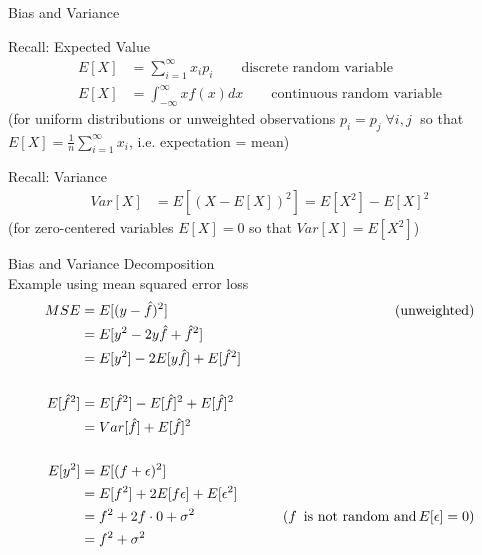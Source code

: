 \documentclass[ignorenonframetext,xcolor=x11names]{beamer}
\begin{document}
\begin{frame}{Bias and Variance}
\begin{block}{Recall: Expected Value}
\begin{align*}
E[X] &= \sum_{i=1}^{\infty} x_i p_i \qquad \text{discrete random variable}\\
E[X] &= \int_{-\infty}^{\infty} x f(x) dx \qquad \text{continuous random variable}
\end{align*}
(for uniform distributions or unweighted observations $p_i=p_j \; \forall i, j \; $ so that $E[X] = \frac{1}{n} \sum_{i=1}^{\infty} x_i $, i.e. expectation = mean)
\end{block}

\begin{block}{Recall: Variance}
\begin{align*}
Var[X] &= E[(X - E[X])^2] = E[X^2] - E[X]^2 
\end{align*}
(for zero-centered variables $E[X] = 0$ so that $Var[X] = E[X^2]$)
\end{block}
\end{frame}

\begin{frame}{Bias and Variance Decomposition \\ \small Example using mean squared error loss}
\begin{align*}
MSE &= E[(y - \hat{f})^2] &\qquad (\text{unweighted})\\
    & = E [ y^2 - 2 y \hat{f} + \hat{f}^2] \\
    &= E [y^2] - 2E[y\hat{f}] + E[\hat{f}^2] \\
\\
E[\hat{f}^2] &= E[\hat{f}^2] - E[\hat{f}]^2 + E[\hat{f}]^2 \\
             &= Var[\hat{f}] + E[\hat{f}]^2 \\
\\             
E[y^2] &= E[(f+\epsilon)^2] \\
       &= E[f^2] + 2E[f \epsilon] + E[\epsilon^2]\\
       &= f^2 + 2f \cdot 0 + \sigma^2 &\qquad (f \text{\, is not random and} \, E[\epsilon] = 0)\\
       &= f^2 + \sigma^2 \\ 
\end{align*}
\end{frame}
\end{document}
